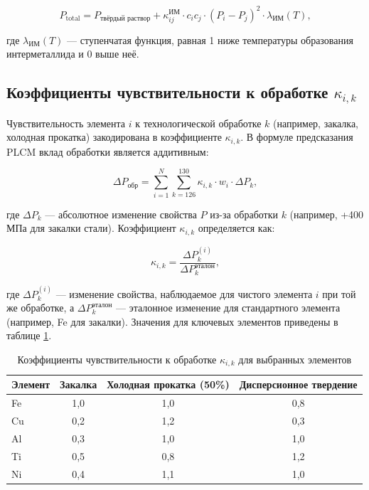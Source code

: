 \documentclass[12pt,a4paper]{article}
\begin{document}
	\begin{equation}
		P_{\text{total}} = P_{\text{твёрдый раствор}} + \kappa_{ij}^{\text{ИМ}} \cdot c_i c_j \cdot (P_i - P_j)^2 \cdot \lambda_{\text{ИМ}}(T),
		\label{eq:intermetallic-term}
	\end{equation}
	
	где \(\lambda_{\text{ИМ}}(T)\) — ступенчатая функция, равная 1 ниже температуры образования интерметаллида и 0 выше неё.
	
	\subsection{Коэффициенты чувствительности к обработке \(\kappa_{i,k}\)}
	\label{subsec:processing-coefficients}
	
	Чувствительность элемента \(i\) к технологической обработке \(k\) (например, закалка, холодная прокатка) закодирована в коэффициенте \(\kappa_{i,k}\). В формуле предсказания PLCM вклад обработки является аддитивным:
	
	\begin{equation}
		\Delta P_{\text{обр}} = \sum_{i=1}^{N} \sum_{k=126}^{130} \kappa_{i,k} \cdot w_i \cdot \Delta P_k,
		\label{eq:proc-contribution}
	\end{equation}
	
	где \(\Delta P_k\) — абсолютное изменение свойства \(P\) из-за обработки \(k\) (например, +400 МПа для закалки стали). Коэффициент \(\kappa_{i,k}\) определяется как:
	
	\begin{equation}
		\kappa_{i,k} = \frac{\Delta P_k^{(i)}}{\Delta P_k^{\text{эталон}}},
		\label{eq:kappa-proc-def}
	\end{equation}
	
	где \(\Delta P_k^{(i)}\) — изменение свойства, наблюдаемое для чистого элемента \(i\) при той же обработке, а \(\Delta P_k^{\text{эталон}}\) — эталонное изменение для стандартного элемента (например, Fe для закалки). Значения для ключевых элементов приведены в таблице \ref{tab:kappa-proc}.
	
	\begin{table}[htbp]
		\centering
		\caption{Коэффициенты чувствительности к обработке \(\kappa_{i,k}\) для выбранных элементов}
		\label{tab:kappa-proc}
		\begin{tabular}{lccc}
			\toprule
			Элемент & Закалка & Холодная прокатка (50\%) & Дисперсионное твердение \\
			\midrule
			Fe & 1,0 & 1,0 & 0,8 \\
			Cu & 0,2 & 1,2 & 0,3 \\
			Al & 0,3 & 1,0 & 1,0 \\
			Ti & 0,5 & 0,8 & 1,2 \\
			Ni & 0,4 & 1,1 & 1,0 \\
			\bottomrule
		\end{tabular}
	\end{table}
	
\end{document}
